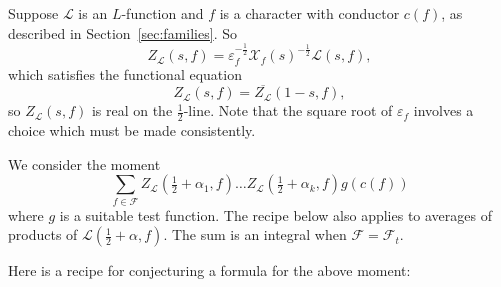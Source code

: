 \documentclass[12pt,letterpaper]{amsart}
\theoremstyle{plain}
\theoremstyle{definition}
\theoremstyle{remark}
\numberwithin{equation}{subsection}
\numberwithin{theorem}{subsection}
\numberwithin{table}{subsection}
\begin{document}
Suppose $\mathcal L$ is an $L$-function and $f$ is a character with conductor $c(f)$,
as described in Section~\ref{sec:families}.  So
\begin{equation}Z_\mathcal{L}(s,f)=\varepsilon_f^{-\frac 12}\mathcal{X}_f(s)^{-\frac 12}\mathcal{L}(s,f),
\label{eqn:ZLf}
\end{equation}
which satisfies the functional equation
\begin{equation}Z_\mathcal{L}(s,f)=  \overline{Z_\mathcal{L}}(1-s,f),
\end{equation}
so $Z_\mathcal{L}(s,f)$ is real on the $\frac12$-line. 
Note that the square root of $\varepsilon_f$ involves a choice which
must be made consistently.

We consider the
moment
\begin{equation}
\sum_{f\in \mathcal F} Z_\mathcal{L}(\tfrac12 +\alpha_1,f)\dots
Z_\mathcal{L}(\tfrac12 +\alpha_k,f) g(c(f))
\end{equation}
where $g$ is a suitable test function. The recipe below also applies 
to averages of products of 
$\mathcal{L}(\tfrac12 +\alpha,f)$.  The sum is an integral
when ${\mathcal F}={\mathcal F}_t$.  

Here is a recipe for conjecturing a formula for the above moment:
\end{document}
